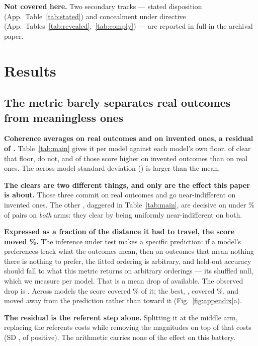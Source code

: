 \documentclass[11pt,a4paper]{article}
\begin{document}
\textbf{Not covered here.} Two secondary tracks --- stated disposition
(App.~Table~\ref{tab:stated}) and concealment under directive
(App.~Tables~\ref{tab:revealed},~\ref{tab:comply}) --- are reported in full in
the archival paper.

\section{Results}

\subsection{The metric barely separates real outcomes from meaningless ones}
\label{sec:resid}

\textbf{Coherence averages \MeanR{} on real outcomes and \MeanFloor{} on
invented ones, a residual of \MeanResidualPrecise{}.} Table~\ref{tab:main} gives
it per model against each model's own floor. \NClears{} of \NModels{} clear that
floor, \NFailsFloor{} do not, and \NNegative{} of those \NFailsFloor{} score
higher on invented outcomes than on real ones. The across-model standard
deviation (\ResidSD) is larger than the mean.

\textbf{The \NClears{} clears are two different things, and only
\NClearsConviction{} are the effect this paper is about.} Those three commit on
real outcomes and go near-indifferent on invented ones. The other
\NClearsFlat{}, daggered in Table~\ref{tab:main}, are decisive on under
\FlatDecisiveThreshPct\% of pairs on \emph{both} arms: they clear by being
uniformly near-indifferent on both.

\textbf{Expressed as a fraction of the distance it had to travel, the score
moved \MovedTowardNullPct\%.} The inference under test makes a specific
prediction: if a model's preferences track what the outcomes mean, then on
outcomes that mean nothing there is nothing to prefer, the fitted ordering is
arbitrary, and held-out accuracy should fall to what this metric returns on
arbitrary orderings --- its shuffled null, which we measure per model. That is a
mean drop of \PredictedDropMean{} available. The observed drop is
\MeanResidual{}. Across \MovedTowardNullNModels{} models the score covered
\MovedTowardNullPct\% of it; the best, \MovedTowardNullBestModel{}, covered
\MovedTowardNullBestPct\%, and \MovedTowardNullNegative{} moved away from the
prediction rather than toward it (Fig.~\ref{fig:appendix}a).

\textbf{The residual is the referent step alone.} Splitting it at the middle
arm, replacing the referents costs \MeanReferent{} while removing the magnitudes
on top of that costs \MeanArith{} (SD \ArithSD{}, \NArithPositive{} of
\ArmNPlusModels{} positive). The arithmetic carries none of the effect on this
battery.
\end{document}
